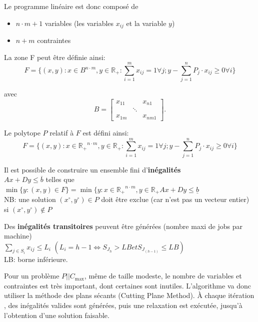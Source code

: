 \documentclass[a4paper,12pt]{report}
\theoremstyle{plain}				%
\theoremstyle{definition}				%
\newcommand\problemGrahamP{$P||C_{\max}$\xspace}
\newcommand{\lp}[1]{\todo[author=LP,color=yellow,inline]{#1}}
\begin{document}
Le programme linéaire est donc composé de
\begin{itemize}
\item $n \cdot m + 1$ variables (les variables $x_{ij}$ et la variable $y$)
\item $n+m$ contraintes
\end{itemize}

La zone F peut être définie ainsi:
\[
  F=\{ (x,y) : x \in B^{n \cdot m}, y \in \mathbb{R_+} : \sum_{i=1}^{m} x_{ij}=1 \forall j;
y-\sum_{j=1}^{n} P_j \cdot x_{ij} \geq 0 \forall i \}
\]

avec
\[
B=\begin{bmatrix}
x_{11}& &x_{n1}\\
& \ddots & \\
x_{1m}& &x_{nm1}
\end{bmatrix}.
\]

Le polytope $P$ relatif à $F$ est défini ainsi:
\[
  F=\{ (x,y) : x \in \mathbb{R_+}^{n \cdot m}, y \in \mathbb{R_+} : \sum_{i=1}^{m} x_{ij}=1 \forall j;
  y-\sum_{j=1}^{n} P_j \cdot x_{ij} \geq 0 \forall i	\}
\]
\lp{Tu n'avais pas dit P ?}

Il est possible de construire un ensemble fini d'\textbf{inégalités} \\
$Ax+Dy \leq \overline{b}$ telles que \\
$\min \{y : (x,y) \in F \} = \min \{y : x \in \mathbb{R_+}^{n \cdot m}, y \in \mathbb{R_+} Ax+Dy \leq \underline{b}$ \\
NB: une solution
$(x \ensuremath{^\circ} , y\ensuremath{^\circ}) \in P$ doit être
exclue (car n'est pas un vecteur entier) si
$(x\ensuremath{^\circ}, y\ensuremath{^\circ}) \notin P $

\bigskip
Des \textbf{inégalités transitoires} peuvent être générées (nombre maxi de jobs par machine) \\
$\sum_{j \in S_i} x_{ij} \leq L_i$ \quad $(L_i = h-1 \iff S_{J_h} > LB et S_{J_{(h-1)}} \leq LB)$\\
LB: borne inférieure.

\bigskip

Pour un problème \problemGrahamP, même de taille modeste, le nombre de
variables et contraintes est très important, dont certaines sont
inutiles.
L'algorithme va donc utiliser la méthode des plans sécants (Cutting
Plane Method).
\`A chaque itération , des inégalités valides sont générées, puis une
relaxation est exécutée, jusqu'à l'obtention d'une solution faisable.
\end{document}
